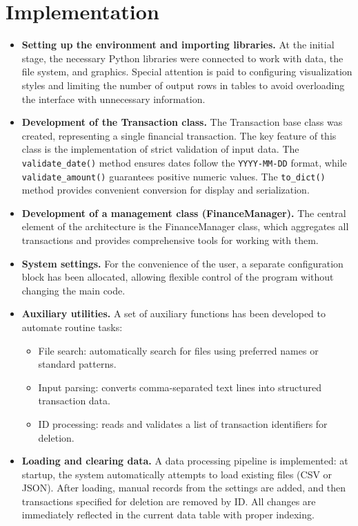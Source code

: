 \documentclass[conference]{IEEEtran}
\begin{document}
\section{Implementation}
\begin{itemize}
\item \textbf{Setting up the environment and importing libraries.} At the initial stage, the necessary Python libraries were connected to work with data, the file system, and graphics. Special attention is paid to configuring visualization styles and limiting the number of output rows in tables to avoid overloading the interface with unnecessary information.
\item \textbf{Development of the Transaction class.} The Transaction base class was created, representing a single financial transaction. The key feature of this class is the implementation of strict validation of input data. The \texttt{validate\_date()} method ensures dates follow the \texttt{YYYY-MM-DD} format, while \texttt{validate\_amount()} guarantees positive numeric values. The \texttt{to\_dict()} method provides convenient conversion for display and serialization.
\item \textbf{Development of a management class (FinanceManager).} The central element of the architecture is the FinanceManager class, which aggregates all transactions and provides comprehensive tools for working with them.
\item \textbf{System settings.} For the convenience of the user, a separate configuration block has been allocated, allowing flexible control of the program without changing the main code.
\item \textbf{Auxiliary utilities.} A set of auxiliary functions has been developed to automate routine tasks:
\begin{itemize}
\item File search: automatically search for files using preferred names or standard patterns.
\item Input parsing: converts comma-separated text lines into structured transaction data.
\item ID processing: reads and validates a list of transaction identifiers for deletion.
\end{itemize}
\item \textbf{Loading and clearing data.} A data processing pipeline is implemented: at startup, the system automatically attempts to load existing files (CSV or JSON). After loading, manual records from the settings are added, and then transactions specified for deletion are removed by ID. All changes are immediately reflected in the current data table with proper indexing.

\end{itemize}
\end{document}
